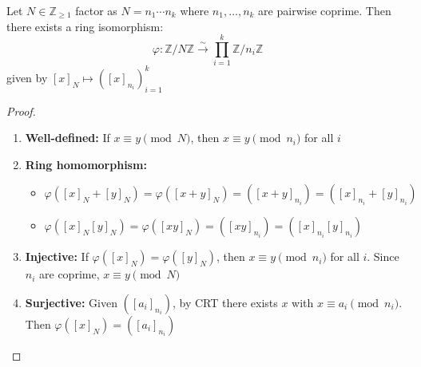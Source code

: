 \begin{proposition}
  Let $N \in \mathbb{Z}_{\geq 1}$ factor as $N = n_1\cdots n_k$ where $n_1,\ldots,n_k$ are pairwise coprime. Then there exists a ring isomorphism:
  \[
    \varphi: \mathbb{Z}/N\mathbb{Z} \xrightarrow{\sim} \prod_{i=1}^k \mathbb{Z}/n_i\mathbb{Z}
  \]
  given by $[x]_N \mapsto ([x]_{n_i})_{i=1}^k$
\end{proposition}
\begin{proof}
  \begin{enumerate}
    \item \textbf{Well-defined:} If $x \equiv y \pmod{N}$, then $x \equiv y \pmod{n_i}$ for all $i$

    \item \textbf{Ring homomorphism:}
      \begin{itemize}
        \item $\varphi([x]_N + [y]_N) = \varphi([x+y]_N) = ([x+y]_{n_i}) = ([x]_{n_i} + [y]_{n_i})$
        \item $\varphi([x]_N[y]_N) = \varphi([xy]_N) = ([xy]_{n_i}) = ([x]_{n_i}[y]_{n_i})$
      \end{itemize}

    \item \textbf{Injective:} If $\varphi([x]_N) = \varphi([y]_N)$, then $x \equiv y \pmod{n_i}$ for all $i$.
      Since $n_i$ are coprime, $x \equiv y \pmod{N}$

    \item \textbf{Surjective:} Given $([a_i]_{n_i})$, by CRT there exists $x$ with $x \equiv a_i \pmod{n_i}$.
      Then $\varphi([x]_N) = ([a_i]_{n_i})$
  \end{enumerate}
\end{proof}

